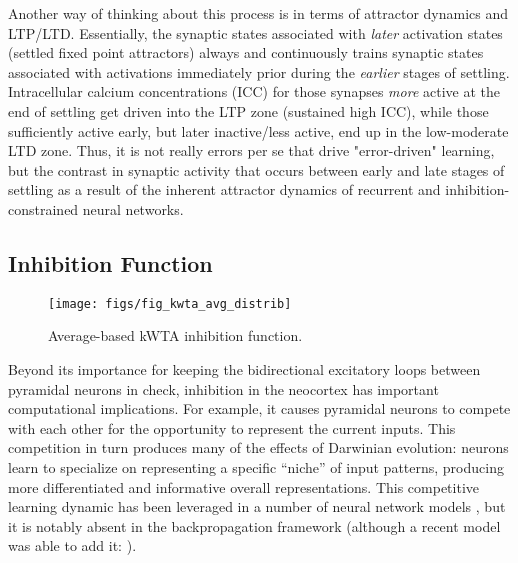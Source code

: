 \documentclass[11pt,twoside]{article}
\begin{document}
Another way of thinking about this process is in terms of attractor dynamics
and LTP/LTD. Essentially, the synaptic states associated with {\em later}
activation states (settled fixed point attractors) always and continuously
trains synaptic states associated with activations immediately prior during
the {\em earlier} stages of settling.  Intracellular calcium concentrations
(ICC) for those synapses {\em more} active at the end of settling get driven into
the LTP zone (sustained high ICC), while those sufficiently active early, but later
inactive/less active, end up in the low-moderate LTD zone.  Thus, it is not
really errors per se that drive "error-driven" learning, but the contrast in
synaptic activity that occurs between early and late stages of settling as a
result of the inherent attractor dynamics of recurrent and
inhibition-constrained neural networks.

\subsection{Inhibition Function}

\begin{figure}
  \centering\texttt{[image: figs/fig\_kwta\_avg\_distrib]}
  \caption{\small Average-based kWTA inhibition function.}
  \label{fig.kwta_avg}
\end{figure}

Beyond its importance for keeping the bidirectional excitatory loops between
pyramidal neurons in check, inhibition in the neocortex has important
computational implications.  For example, it causes pyramidal neurons to
compete with each other for the opportunity to represent the current inputs.
This competition in turn produces many of the effects of Darwinian evolution:
neurons learn to specialize on representing a specific ``niche'' of input
patterns, producing more differentiated and informative overall
representations.  This competitive learning dynamic has been leveraged in a
number of neural network models \cite{JacobJordanNowlanEtAl91,Kohonen77,Kohonen82,Kohonen82b,Kohonen84,Nowlan90,Nowlan91,RumelhartZipser85,RumelhartZipser86}, but it is notably absent in the backpropagation framework (although a recent model was able to add it: \cite{SaraLaslo}).
\end{document}
